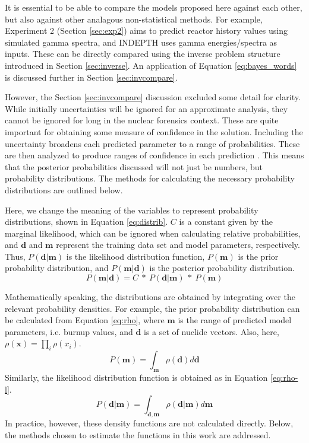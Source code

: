 It is essential to be able to compare the models proposed here against each
other, but also against other analagous non-statistical methods.  For example,
Experiment 2 (Section \ref{sec:exp2}) aims to predict reactor history values
using simulated gamma spectra, and \gls{INDEPTH} uses gamma energies/spectra as
inputs.  These can be directly compared using the inverse problem structure
introduced in Section \ref{sec:inverse}. An application of Equation
\ref{eq:bayes_words} is discussed further in Section \ref{sec:invcompare}.

However, the Section \ref{sec:invcompare} discussion excluded some detail for
clarity. While initially uncertainties will be ignored for an approximate
analysis, they cannot be ignored for long in the nuclear forensics context.
These are quite important for obtaining some measure of confidence in the
solution.  Including the uncertainty broadens each predicted parameter to a
range of probabilities.  These are then analyzed to produce ranges of
confidence in each prediction \cite{bayes_compare}.  This means that the
posterior probabilities discussed will not just be numbers, but probability
distributions.  The methods for calculating the necessary probability
distributions are outlined below.

Here, we change the meaning of the variables to represent probability
distributions, shown in Equation \ref{eq:distrib}.  $C$ is a constant given by
the marginal likelihood, which can be ignored when calculating relative
probabilities, and $\boldsymbol{d}$ and $\boldsymbol{m}$ represent the training
data set and model parameters, respectively. Thus,
$P(\boldsymbol{d}|\boldsymbol{m})$ is the likelihood distribution function,
$P(\boldsymbol{m})$ is the prior probability distribution, and
$P(\boldsymbol{m}|\boldsymbol{d})$ is the posterior probability distribution.
\begin{equation}
\label{eq:distrib}
  P(\boldsymbol{m}|\boldsymbol{d}) = C\ *\
  P(\boldsymbol{d}|\boldsymbol{m})\ *\ P(\boldsymbol{m})
\end{equation}

Mathematically speaking, the distributions are obtained by integrating over the
relevant probability densities.  For example, the prior probability
distribution can be calculated from Equation \ref{eq:rho}, where
$\boldsymbol{m}$ is the range of predicted model parameters, i.e. burnup
values, and $\boldsymbol{d}$ is a set of nuclide vectors. Also, here,
$\rho(\boldsymbol{x}) = \prod_{i} \rho(x_i)$. 
\begin{equation}
\label{eq:rho}
  P(\boldsymbol{m}) = \int_{\boldsymbol{m}} \rho(\boldsymbol{d}) d\boldsymbol{d}
\end{equation}
Similarly, the likelihood distribution function is obtained as in Equation 
\ref{eq:rho-l}.
\begin{equation}
\label{eq:rho-l}
  P(\boldsymbol{d}|\boldsymbol{m}) = \int_{\boldsymbol{d}, \boldsymbol{m}} \rho(\boldsymbol{d}|\boldsymbol{m}) d\boldsymbol{m}
\end{equation}
In practice, however, these density functions are not calculated directly.
Below, the methods chosen to estimate the functions in this work are addressed.

